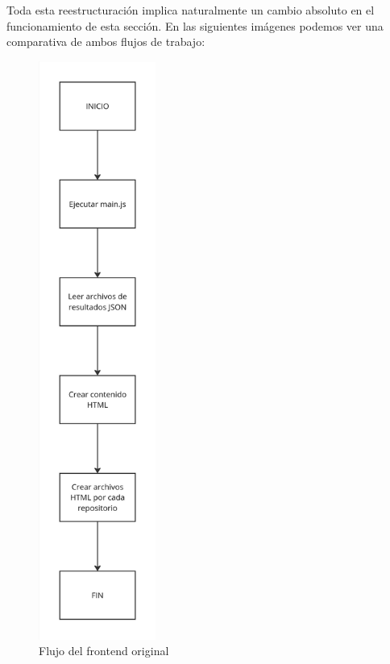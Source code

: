 \documentclass[a4paper, 12pt]{book}
\begin{document}
Toda esta reestructuración implica naturalmente un cambio absoluto en el funcionamiento de esta sección. En las siguientes imágenes podemos ver una comparativa de ambos flujos de trabajo:

\begin{figure}[H]
    \centering
    \includegraphics[height=19cm, keepaspectratio]{img/esquema_frontend_original.jpg}
    \caption{Flujo del frontend original}
    \label{fig:original_frontend}
\end{figure}
\end{document}
